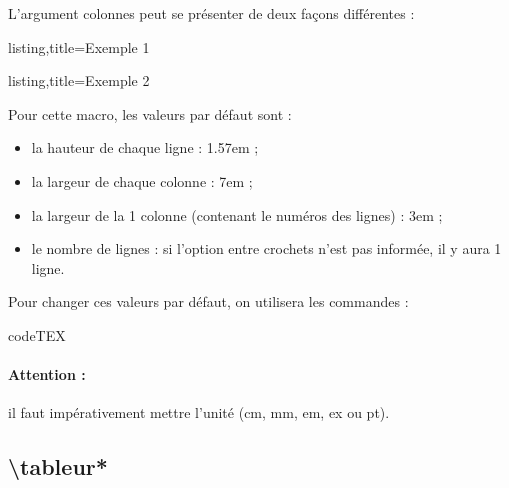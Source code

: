 \documentclass[a4paper,french]{article}
\begin{document}
L'argument \og colonnes \fg{} peut se pr\'esenter de deux fa\c cons diff\'erentes :

\bigskip

\begin{tcblisting}{listing,title=Exemple 1}
\end{tcblisting}

\bigskip

\begin{tcblisting}{listing,title=Exemple 2}
\end{tcblisting}

\bigskip

Pour cette macro, les valeurs par d\'efaut sont :

\medskip

\begin{itemize}
\item la hauteur de chaque ligne : 1.57em ;
\item la largeur de chaque colonne : 7em ;
\item la largeur de la 1\iere{} colonne (contenant le num\'eros des lignes) : 3em ;
\item le nombre de lignes : si l'option entre crochets n'est pas inform\'ee, il y aura 1 ligne.
\end{itemize}

\medskip

Pour changer ces valeurs par d\'efaut, on utilisera les commandes :

\medskip

\begin{tcblisting}{codeTEX}
\tabcolwidth{2cm} %
\tabnumlinewidth{1cm} %
\tablineheight{15mm} %
\end{tcblisting}

\paragraph*{Attention :} il faut imp\'erativement mettre l'unit\'e (cm, mm, em, ex ou pt).

\subsection{\textbackslash tableur*}
\end{document}
